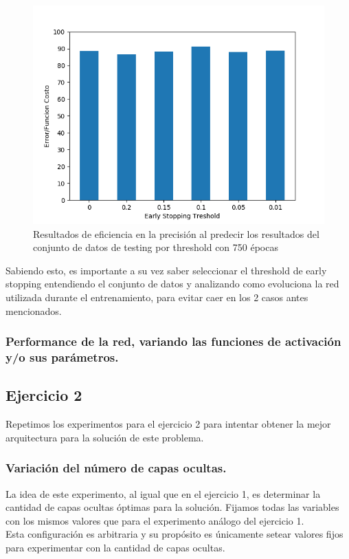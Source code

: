 \begin{figure}[!htbp]
  \begin{center}
  \includegraphics[scale=0.60]{graficos/early_stopping_testing_750ep.png}
  \caption{Resultados de eficiencia en la precisión al predecir los resultados del conjunto de datos de testing por threshold con 750 épocas}
  \end{center}
\end{figure}

Sabiendo esto, es importante a su vez saber seleccionar el threshold de early stopping entendiendo el conjunto de datos y analizando como evoluciona la 
red utilizada durante el entrenamiento, para evitar caer en los 2 casos antes mencionados. 

\subsubsection{Performance de la red, variando las funciones de activación y/o sus parámetros.}

\newpage
\subsection{Ejercicio 2}

Repetimos los experimentos para el ejercicio 2 para intentar obtener la mejor arquitectura para la solución de este problema.

\subsubsection{Variación del número de capas ocultas.}
La idea de este experimento, al igual que en el ejercicio 1, es determinar la cantidad de capas ocultas óptimas para la solución. Fijamos todas las variables con los mismos valores que para el experimento análogo del ejercicio 1.\\
Esta configuración es arbitraria y su propósito es únicamente setear valores fijos para experimentar con la cantidad de capas ocultas.\\

